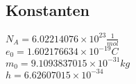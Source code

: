 \subsection{Konstanten}
\label{sec:Konstanten}
\begin{center}
    $N_A=6.02214076 \times 10^23 \frac{1}{mol}$\\
    $e_0=1.602176634\times10^{-19} C$\\
    $m_0=9.1093837015\times 10^{-31} kg$\\
    $h=6.62607015\times 10^{-34}$
\end{center}